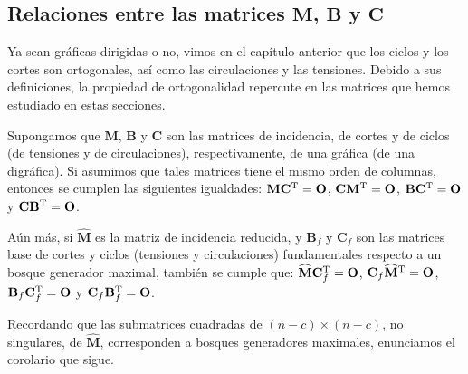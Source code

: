 \subsection{Relaciones entre las matrices $\mathbf{M}$, $\mathbf{B}$ y $\mathbf{C}$}

Ya sean gráficas dirigidas o no, vimos en el capítulo anterior que los ciclos y los cortes son ortogonales, así como las circulaciones y las tensiones. Debido a sus definiciones, la propiedad de ortogonalidad repercute en las matrices que hemos estudiado en estas secciones.

\begin{teo}
Supongamos que $\mathbf{M}$, $\mathbf{B}$ y $\mathbf{C}$ son las matrices de incidencia, de cortes y de ciclos (de tensiones y de circulaciones), respectivamente, de una gráfica (de una digráfica). Si asumimos que tales matrices tiene el mismo orden de columnas, entonces se cumplen las siguientes igualdades: $\mathbf{M}\mathbf{C}^{\textnormal{T}} = \mathbf{O}$, $\mathbf{C}\mathbf{M}^{\textnormal{T}} = \mathbf{O}$, $\mathbf{B}\mathbf{C}^{\textnormal{T}} = \mathbf{O}$ y $\mathbf{C}\mathbf{B}^{\textnormal{T}} = \mathbf{O}$.

Aún más, si $\mathbf{\widehat{M}}$ es la matriz de incidencia reducida, y $\mathbf{B}_{f}$ y $ \mathbf{C}_{f}$ son las matrices base de cortes y ciclos (tensiones y circulaciones) fundamentales respecto a un bosque generador maximal, también se cumple que: $\mathbf{\widehat{M}}\mathbf{C}_{f}^{\textnormal{T}} = \mathbf{O}$, $\mathbf{C}_{f}\mathbf{\widehat{M}}^{\textnormal{T}} = \mathbf{O}$, $\mathbf{B}_{f}\mathbf{C}_{f}^{\textnormal{T}} = \mathbf{O}$ y $\mathbf{C}_{f}\mathbf{B}_{f}^{\textnormal{T}}= \mathbf{O}$.
\end{teo}

Recordando que las submatrices cuadradas de $(n-c) \times (n-c)$, no singulares, de $\mathbf{\widehat{M}}$, corresponden a bosques generadores maximales, enunciamos el corolario que sigue.

